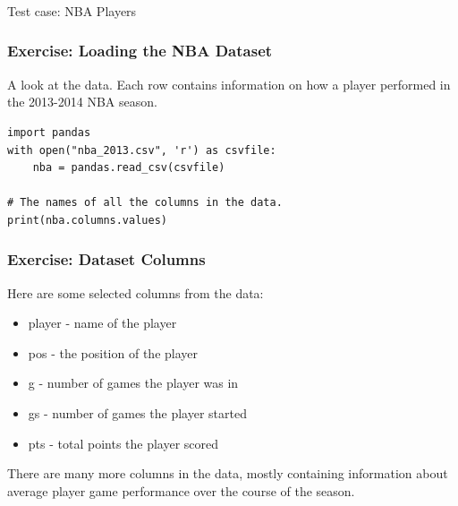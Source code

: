 \begin{frame}[fragile]\frametitle{}
\begin{center}
{\Large Test case: NBA Players}
\end{center}
\end{frame}

\begin{frame}[fragile]\frametitle{Exercise: Loading the NBA Dataset}
A look at the data. Each row contains information on how a player performed in the
2013-2014 NBA season.
\begin{lstlisting}
import pandas
with open("nba_2013.csv", 'r') as csvfile:
    nba = pandas.read_csv(csvfile)

# The names of all the columns in the data.
print(nba.columns.values)
\end{lstlisting}
\end{frame}

\begin{frame}[fragile]\frametitle{Exercise: Dataset Columns}
Here are some selected columns from the data:
\begin{itemize}
\item     player - name of the player
\item     pos - the position of the player
\item     g - number of games the player was in
\item     gs - number of games the player started
\item     pts - total points the player scored
\end{itemize}
There are many more columns in the data, mostly containing information about average player game performance over the course of the season.
\end{frame}

